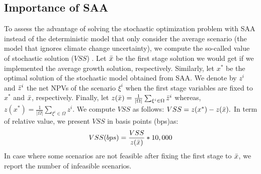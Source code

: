 \documentclass[forests,article,submit,moreauthors,pdftex]{Definitions/mdpi}
\begin{document}


\subsection{Importance of SAA}
To assess the advantage of solving the stochastic optimization problem with SAA instead of the deterministic model that only consider the average scenario (the model that ignores climate change uncertainty), we compute the so-called value of stochastic solution ($VSS$) \citep{Birge1982}.
Let $\Bar{x}$  be the first stage solution we would get if we implemented the average growth solution, respectively. Similarly, let $x^{*}$ be the optimal solution of the stochastic model obtained from SAA. 
We denote by $z^{i}$ and $\Bar{z}^{i}$  the net NPVs of the scenario $\xi^{i}$ when the first stage variables are fixed to $x^{*}$ and $\Bar{x}$, respectively. Finally, let $z(\Bar{x}) = \frac{1}{|\Omega|}\sum_{\xi^{i} \in \Omega}\Bar{z}^{i}$ whereas, $z(x^{*}) = \frac{1}{|\Omega|}\sum_{\xi^{i} \in \Omega} z^{i}$. We compute $VSS$ as follows:
$
    VSS = z(x^{*}) - z(\Bar{x}).   
$
In term of relative value, we present $VSS$ in basis points (bps)\footnotemark as:
\begin{align}
    VSS(bps) = \frac{ VSS}{z(\Bar{x})} * 10,000
\end{align}
In case where some scenarios are not feasible after fixing the first stage to $\Bar{x}$, we report the number of infeasible scenarios. 
\end{document}
